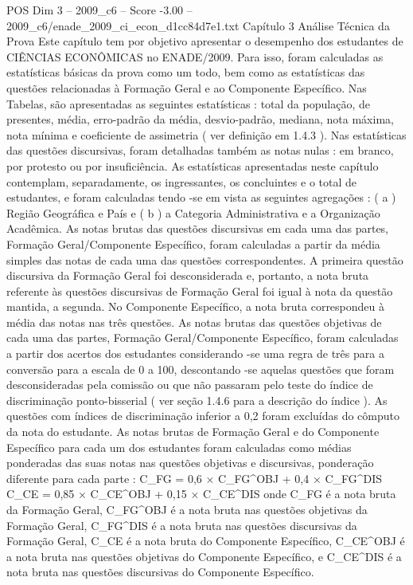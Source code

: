 \begin{textsample}{POS Dim 3 – 2009\_c6 – Score -3.00 – 2009\_c6/enade\_2009\_ci\_econ\_d1cc84d7e1.txt}  \label{ex:f3_pos_241}
Capítulo 3 Análise Técnica da Prova Este capítulo tem por objetivo apresentar o desempenho dos estudantes de CIÊNCIAS ECONÔMICAS no ENADE/2009.
Para isso, foram calculadas as estatísticas básicas da prova como um todo, bem como as estatísticas das questões relacionadas à Formação Geral e ao Componente Específico.
Nas Tabelas, são apresentadas as seguintes estatísticas : total da população, de presentes, média, erro-padrão da média, desvio-padrão, mediana, nota máxima, nota mínima e coeficiente de assimetria ( ver definição em 1.4.3 ).
Nas estatísticas das questões discursivas, foram detalhadas também as notas nulas : em branco, por protesto ou por insuficiência.
As estatísticas apresentadas neste capítulo contemplam, separadamente, os ingressantes, os concluintes e o total de estudantes, e foram calculadas tendo -se em vista as seguintes agregações : ( a ) Região Geográfica e País e ( b ) a Categoria Administrativa e a Organização Acadêmica.
As notas brutas das questões discursivas em cada uma das partes, Formação Geral/Componente Específico, foram calculadas a partir da média simples das notas de cada uma das questões correspondentes.
A primeira questão discursiva da Formação Geral foi desconsiderada e, portanto, a nota bruta referente às questões discursivas de Formação Geral foi igual à nota da questão mantida, a segunda.
No Componente Específico, a nota bruta correspondeu à média das notas nas três questões.
As notas brutas das questões objetivas de cada uma das partes, Formação Geral/Componente Específico, foram calculadas a partir dos acertos dos estudantes considerando -se uma regra de três para a conversão para a escala de 0 a 100, descontando -se aquelas questões que foram desconsideradas pela comissão ou que não passaram pelo teste do índice de discriminação ponto-bisserial ( ver seção 1.4.6 para a descrição do índice ).
As questões com índices de discriminação inferior a 0,2 foram excluídas do cômputo da nota do estudante.
As notas brutas de Formação Geral e do Componente Específico para cada um dos estudantes foram calculadas como médias ponderadas das suas notas nas questões objetivas e discursivas, ponderação diferente para cada parte : C\_FG = 0,6 × C\_FG\textasciicircum{}OBJ + 0,4 × C\_FG\textasciicircum{}DIS C\_CE = 0,85 × C\_CE\textasciicircum{}OBJ + 0,15 × C\_CE\textasciicircum{}DIS onde C\_FG é a nota bruta da Formação Geral, C\_FG\textasciicircum{}OBJ é a nota bruta nas questões objetivas da Formação Geral, C\_FG\textasciicircum{}DIS é a nota bruta nas questões discursivas da Formação Geral, C\_CE é a nota bruta do Componente Específico, C\_CE\textasciicircum{}OBJ é a nota bruta nas questões objetivas do Componente Específico, e C\_CE\textasciicircum{}DIS é a nota bruta nas questões discursivas do Componente Específico.

\end{textsample}
